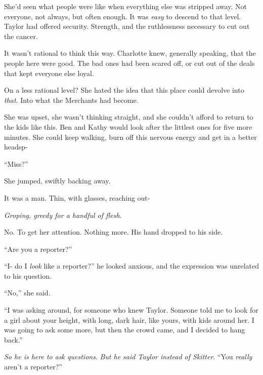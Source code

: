 She'd seen what people were like when everything else was stripped away.  Not everyone, not always, but often enough.  It was \emph{easy} to descend to that level.  Taylor had offered security.  Strength, and the ruthlessness necessary to cut out the cancer.



It wasn't rational to think this way.  Charlotte knew, generally speaking, that the people here were good.  The bad ones had been scared off, or cut out of the deals that kept everyone else loyal.



On a less rational level?  She hated the idea that this place could devolve into \emph{that}.  Into what the Merchants had become.



She was upset, she wasn't thinking straight, and she couldn't afford to return to the kids like this.  Ben and Kathy would look after the littlest ones for five more minutes.  She could keep walking, burn off this nervous energy and get in a better headsp-



``Miss?''



She jumped, swiftly backing away.



It was a man.  Thin, with glasses, reaching out-



\emph{Groping, greedy for a handful of flesh}.



No.  To get her attention.  Nothing more.  His hand dropped to his side.



``Are you a reporter?''



``I- do I \emph{look }like a reporter?'' he looked anxious, and the expression was unrelated to his question.



``No,'' she said.



``I was asking around, for someone who knew Taylor.  Someone told me to look for a girl about your height, with long, dark hair, like yours, with kids around her.  I was going to ask some more, but then the crowd came, and I decided to hang back.''



\emph{So he is here to ask questions}.  \emph{But he said Taylor instead of Skitter}.  ``You \emph{really} aren't a reporter?''



